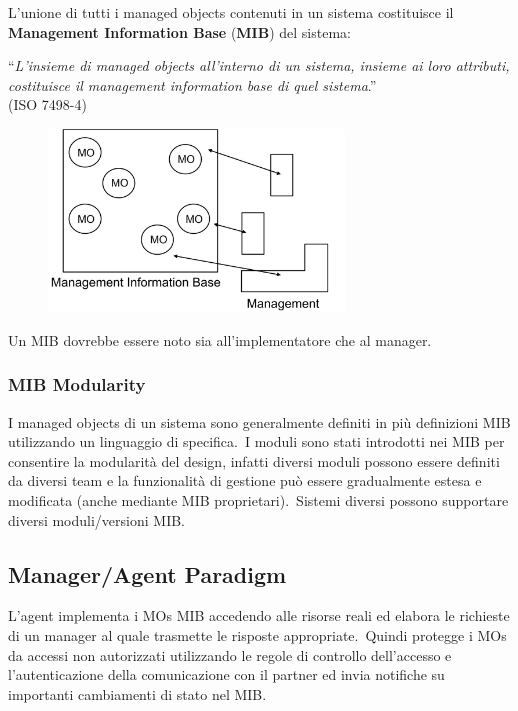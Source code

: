 L'unione di tutti i managed objects contenuti in un sistema costituisce il \textbf{Management Information Base} (\textbf{MIB}) del sistema:
\begin{center}
    ``\textit{L'insieme di managed objects all'interno di un sistema, insieme ai loro attributi, costituisce il management information base di quel sistema}.''\\(ISO 7498-4)
\end{center}
\begin{figure}[H]
    \centering
    \includegraphics[width=0.7\textwidth]{immagini/MIB.jpg}
\end{figure}
Un MIB dovrebbe essere noto sia all'implementatore che al manager.\

\subsubsection{MIB Modularity}

I managed objects di un sistema sono generalmente definiti in più definizioni MIB utilizzando un linguaggio di specifica.\
I moduli sono stati introdotti nei MIB per consentire la modularità del design, infatti diversi moduli possono essere definiti da diversi team e la funzionalità di gestione può essere gradualmente estesa e modificata (anche mediante MIB proprietari).\
Sistemi diversi possono supportare diversi moduli/versioni MIB.

\subsection{Manager/Agent Paradigm}

L'agent implementa i MOs MIB accedendo alle risorse reali ed elabora le richieste di un manager al quale trasmette le risposte appropriate.\
Quindi protegge i MOs da accessi non autorizzati utilizzando le regole di controllo dell'accesso e l'autenticazione della comunicazione con il partner ed invia notifiche su importanti cambiamenti di stato nel MIB.

